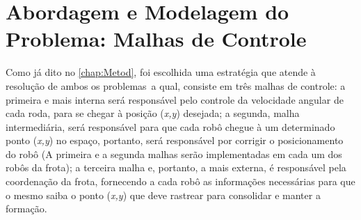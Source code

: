 %
%

\chapter{Abordagem e Modelagem do Problema: Malhas de Controle}
\label{chap:abordagememdelo}



Como já dito no \autoref{chap:Metod}, foi escolhida uma estratégia que atende à resolução de ambos os problemas\ a qual, consiste em três malhas de controle: a primeira e mais interna será responsável pelo controle da velocidade angular de cada roda, para se chegar à posição (\emph{x,y}) desejada; a segunda, malha intermediária, será responsável para que cada robô chegue à um determinado ponto (\emph{x,y}) no espaço, portanto, será responsável por corrigir o posicionamento do robô (A primeira e a segunda malhas serão implementadas em cada um dos robôs da frota); a terceira malha e, portanto, a mais externa, é responsável pela coordenação da frota, fornecendo a cada robô as informações necessárias para que o mesmo saiba o ponto (\emph{x,y}) que deve rastrear para consolidar e manter a formação.

